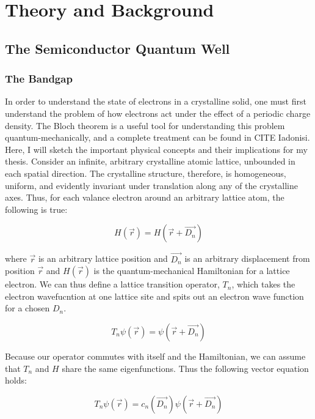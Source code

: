 \chapter{Theory and Background}

\section{The Semiconductor Quantum Well}
\subsection{The Bandgap}
In order to understand the state of electrons in a crystalline solid, one must first understand the problem of how electrons act under the effect of a periodic charge density. The Bloch theorem is a useful tool for understanding this problem quantum-mechanically, and a complete treatment can be found in CITE Iadonisi. Here, I will sketch the important physical concepts and their implications for my thesis. Consider an infinite, arbitrary crystalline atomic lattice, unbounded in each spatial direction. The crystalline structure, therefore, is homogeneous, uniform, and evidently invariant under translation along any of the crystalline axes. Thus, for each valance electron around an arbitrary lattice atom, the following is true:

\begin{equation}
H(\vec{r}) = H(\vec{r} + \vec{D_n})
\end{equation}

where $\vec{r}$ is an arbitrary lattice position and $\vec{D_n}$ is an arbitrary displacement from position $\vec{r}$ and $H(\vec{r})$ is the quantum-mechanical Hamiltonian for a lattice electron. We can thus define a lattice transition operator, $T_n$, which takes the electron wavefucntion at one lattice site and spits out an electron wave function for a chosen $D_n$.

\begin{equation}
T_n\psi(\vec{r}) = \psi(\vec{r} + \vec{D_n})
\end{equation}

Because our operator commutes with itself and the Hamiltonian, we can assume that $T_n$ and $H$ share the same eigenfunctions. Thus the following vector equation holds:

\begin{equation}
T_n\psi(\vec{r}) = c_n(\vec{D_n})\psi(\vec{r} + \vec{D_n})
\end{equation}

